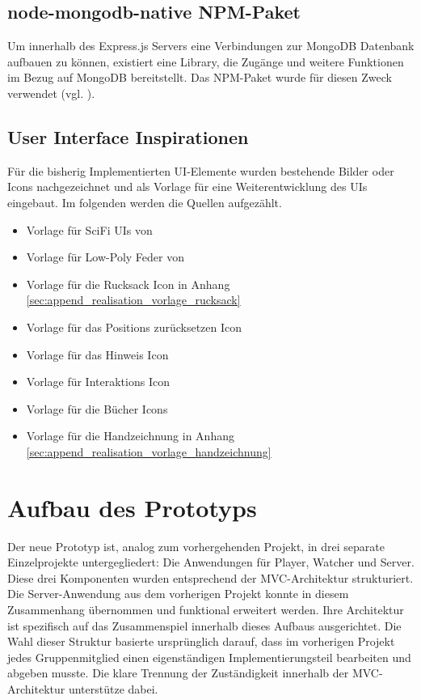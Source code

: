 \subsection{node-mongodb-native NPM-Paket}
Um innerhalb des Express.js Servers eine Verbindungen zur MongoDB Datenbank aufbauen zu können, existiert eine Library, die Zugänge und weitere Funktionen im Bezug auf MongoDB bereitstellt. Das \ac{NPM}-Paket  wurde für diesen Zweck verwendet (vgl. \citealp{mongodb_mongodbnode-mongodb-native_2025}).


\subsection{User Interface Inspirationen}\label{sec:user-interface-inspirations}
Für die bisherig Implementierten \ac{UI}-Elemente wurden bestehende Bilder oder Icons nachgezeichnet und als Vorlage für eine Weiterentwicklung des \ac{UI}s eingebaut. Im folgenden werden die Quellen aufgezählt.

\begin{itemize}
    \item Vorlage für SciFi \ac{UI}s von \cite{pchvector_free_nodate}
    \item Vorlage für Low-Poly Feder von \cite{masud_download_nodate}
    \item Vorlage für die Rucksack Icon in Anhang \ref{sec:append_realisation_vorlage_rucksack}
    \item Vorlage für das Positions zurücksetzen Icon \cite{noauthor_chatgpt_nodate-3}
    \item Vorlage für das Hinweis Icon \cite{noauthor_chatgpt_nodate-2}
    \item Vorlage für Interaktions Icon \cite{noauthor_chatgpt_nodate-1}
    \item Vorlage für die Bücher Icons \cite{noauthor_chatgpt_nodate}
    \item Vorlage für die Handzeichnung in Anhang \ref{sec:append_realisation_vorlage_handzeichnung}
\end{itemize}

\section{Aufbau des Prototyps}

Der neue Prototyp ist, analog zum vorhergehenden Projekt, in drei separate Einzelprojekte untergegliedert: Die Anwendungen für Player, Watcher und Server. Diese drei Komponenten wurden entsprechend der \ac{MVC}-Architektur strukturiert. Die Server-Anwendung aus dem vorherigen Projekt konnte in diesem Zusammenhang übernommen und funktional erweitert werden. Ihre Architektur ist spezifisch auf das Zusammenspiel innerhalb dieses Aufbaus ausgerichtet. Die Wahl dieser Struktur basierte ursprünglich darauf, dass im vorherigen Projekt jedes Gruppenmitglied einen eigenständigen Implementierungsteil bearbeiten und abgeben musste. Die klare Trennung der Zuständigkeit innerhalb der \ac{MVC}-Architektur unterstütze dabei.

